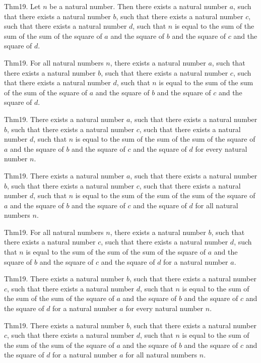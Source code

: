 \documentclass{article}
\begin{document}
Thm19. Let $n$ be a natural number. Then there exists a natural number $a$, such that there exists a natural number $b$, such that there exists a natural number $c$, such that there exists a natural number $d$, such that $n$ is equal to the sum of the sum of the sum of the square of $a$ and the square of $b$ and the square of $c$ and the square of $d$.

Thm19. For all natural numbers $n$, there exists a natural number $a$, such that there exists a natural number $b$, such that there exists a natural number $c$, such that there exists a natural number $d$, such that $n$ is equal to the sum of the sum of the sum of the square of $a$ and the square of $b$ and the square of $c$ and the square of $d$.

Thm19. There exists a natural number $a$, such that there exists a natural number $b$, such that there exists a natural number $c$, such that there exists a natural number $d$, such that $n$ is equal to the sum of the sum of the sum of the square of $a$ and the square of $b$ and the square of $c$ and the square of $d$ for every natural number $n$.

Thm19. There exists a natural number $a$, such that there exists a natural number $b$, such that there exists a natural number $c$, such that there exists a natural number $d$, such that $n$ is equal to the sum of the sum of the sum of the square of $a$ and the square of $b$ and the square of $c$ and the square of $d$ for all natural numbers $n$.

Thm19. For all natural numbers $n$, there exists a natural number $b$, such that there exists a natural number $c$, such that there exists a natural number $d$, such that $n$ is equal to the sum of the sum of the sum of the square of $a$ and the square of $b$ and the square of $c$ and the square of $d$ for a natural number $a$.

Thm19. There exists a natural number $b$, such that there exists a natural number $c$, such that there exists a natural number $d$, such that $n$ is equal to the sum of the sum of the sum of the square of $a$ and the square of $b$ and the square of $c$ and the square of $d$ for a natural number $a$ for every natural number $n$.

Thm19. There exists a natural number $b$, such that there exists a natural number $c$, such that there exists a natural number $d$, such that $n$ is equal to the sum of the sum of the sum of the square of $a$ and the square of $b$ and the square of $c$ and the square of $d$ for a natural number $a$ for all natural numbers $n$.
\end{document}
